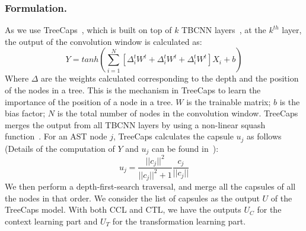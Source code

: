 \subsubsection*{\bf Formulation.}
As we use TreeCaps~\cite{bui2021treecaps}, which is built on top of
$k$ TBCNN layers~\cite{mou2014tbcnn}, at the $k^{th}$ layer, the
output of the convolution window is calculated as:
\begin{equation}\label{eq:treecaps}
	Y = tanh(\sum_{i=1}^{N}[\Delta^t_iW^t + \Delta^t_iW^t + \Delta^t_iW^t]X_i + b)
\end{equation}
Where $\Delta$ are the weights calculated corresponding to the depth
and the position of the nodes in a tree. This is the mechanism in
TreeCaps to learn the importance of the position of a node in a
tree. $W$ is the trainable matrix; $b$ is the bias factor; $N$ is the
total number of nodes in the convolution window. TreeCaps merges the
output from all TBCNN layers by using a non-linear squash
function~\cite{sabour2017dynamic}. For an AST node $j$, TreeCaps
calculates the capsule $u_j$ as follows (Details of the computation of
$Y$ and $u_j$ can be found in~\cite{bui2021treecaps}):
\begin{equation}\label{eq:2}
	u_j = \frac{||c_j||^2}{||c_j||^2+1}\frac{c_j}{||c_j||}
\end{equation}
We then perform a depth-first-search traversal, and merge all the
capsules of all the nodes in that order. We consider the list of
capsules as the output $U$ of the TreeCaps model. With both
CCL and CTL, we have the outputs $U_C$ for the context
learning part and $U_T$ for the transformation learning part.

